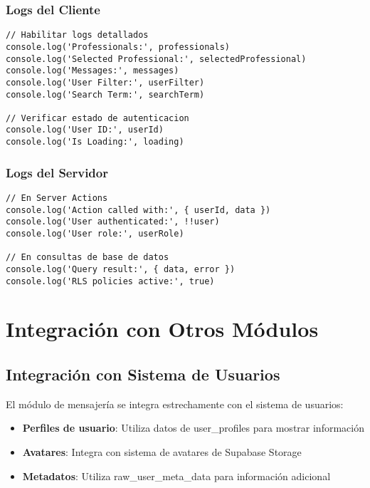 \documentclass[12pt,a4paper]{article}
\begin{document}
\subsubsection{Logs del Cliente}

\begin{lstlisting}[caption=Debugging en cliente]
// Habilitar logs detallados
console.log('Professionals:', professionals)
console.log('Selected Professional:', selectedProfessional)
console.log('Messages:', messages)
console.log('User Filter:', userFilter)
console.log('Search Term:', searchTerm)

// Verificar estado de autenticacion
console.log('User ID:', userId)
console.log('Is Loading:', loading)
\end{lstlisting}

\subsubsection{Logs del Servidor}

\begin{lstlisting}[caption=Debugging en servidor]
// En Server Actions
console.log('Action called with:', { userId, data })
console.log('User authenticated:', !!user)
console.log('User role:', userRole)

// En consultas de base de datos
console.log('Query result:', { data, error })
console.log('RLS policies active:', true)
\end{lstlisting}

\section{Integración con Otros Módulos}

\subsection{Integración con Sistema de Usuarios}

El módulo de mensajería se integra estrechamente con el sistema de usuarios:

\begin{itemize}
    \item \textbf{Perfiles de usuario}: Utiliza datos de user\_profiles para mostrar información
    \item \textbf{Avatares}: Integra con sistema de avatares de Supabase Storage
    \item \textbf{Metadatos}: Utiliza raw\_user\_meta\_data para información adicional
\end{itemize}
\end{document}
